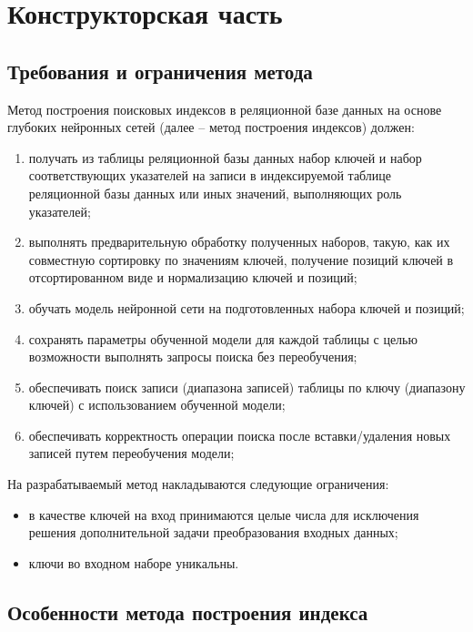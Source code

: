 \chapter{\label{design}Конструкторская часть}

\section{Требования и ограничения метода}

Метод построения поисковых индексов в реляционной базе данных на основе глубоких
нейронных сетей (далее – метод построения индексов) должен:

\begin{enumerate}
    \item получать из таблицы реляционной базы данных набор ключей и набор
        соответствующих указателей на записи в индексируемой таблице реляционной
        базы данных или иных значений, выполняющих роль указателей;
    \item выполнять предварительную обработку полученных наборов, такую, как их
        совместную сортировку по значениям ключей, получение позиций ключей в
        отсортированном виде и нормализацию ключей и позиций;
    \item обучать модель нейронной сети на подготовленных набора ключей и
        позиций;
    \item сохранять параметры обученной модели для каждой таблицы с целью
        возможности выполнять запросы поиска без переобучения;
    \item обеспечивать поиск записи (диапазона записей) таблицы по ключу
        (диапазону ключей) с использованием обученной модели;
    \item обеспечивать корректность операции поиска после вставки/удаления новых
        записей путем переобучения модели;
\end{enumerate}

На разрабатываемый метод накладываются следующие ограничения:

\begin{itemize}
    \item в качестве ключей на вход принимаются целые числа для исключения
        решения дополнительной задачи преобразования входных данных;
    \item ключи во входном наборе уникальны.
\end{itemize}

\section{Особенности метода построения индекса}


